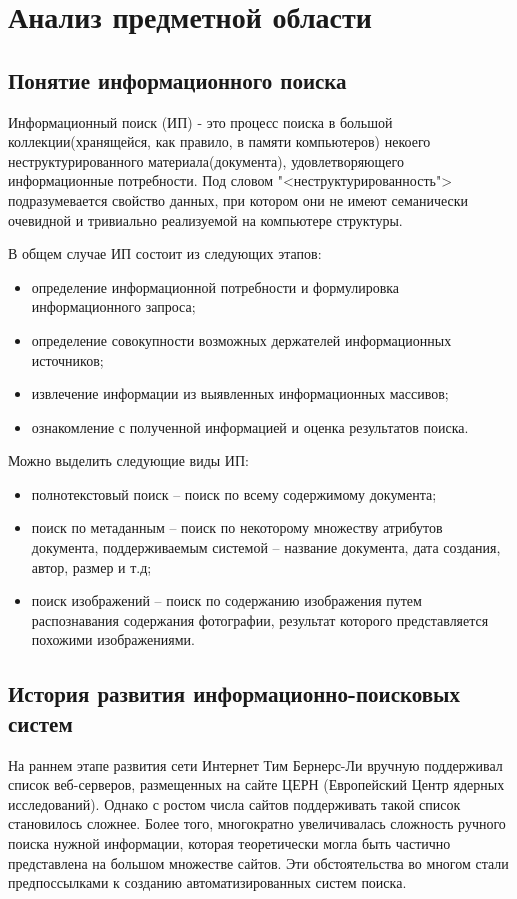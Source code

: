 \section{Анализ предметной области}
\subsection{Понятие информационного поиска}

Информационный поиск (ИП) - это процесс поиска в большой коллекции(хранящейся, как правило, в памяти компьютеров) некоего неструктурированного материала(документа), удовлетворяющего информационные потребности. Под словом "<неструктурированность"> подразумевается свойство данных, при котором они не имеют семанически очевидной и тривиально реализуемой на компьютере структуры.

В общем случае ИП состоит из следующих этапов:
\begin{itemize}
\item определение информационной потребности и формулировка информационного запроса;
\item определение совокупности возможных держателей информационных источников;
\item извлечение информации из выявленных информационных массивов;
\item ознакомление с полученной информацией и оценка результатов поиска.
\end{itemize}

Можно выделить следующие виды ИП:
\begin{itemize}
\item полнотекстовый поиск -- поиск по всему содержимому документа;
\item поиск по метаданным -- поиск по некоторому множеству атрибутов документа, поддерживаемым системой -- название документа, дата создания, автор, размер и т.д;
\item поиск изображений -- поиск по содержанию изображения путем распознавания содержания фотографии, результат которого представляется похожими изображениями.
\end{itemize}
 
\subsection{История развития информационно-поисковых систем}
На раннем этапе развития сети Интернет Тим Бернерс-Ли вручную поддерживал список веб-серверов, размещенных на сайте ЦЕРН (Европейский Центр ядерных исследований). Однако с ростом числа сайтов поддерживать такой список становилось сложнее. Более того, многократно увеличивалась сложность ручного поиска нужной информации, которая теоретически могла быть частично представлена на большом множестве сайтов. Эти обстоятельства во многом стали предпоссылками к созданию автоматизированных систем поиска.

